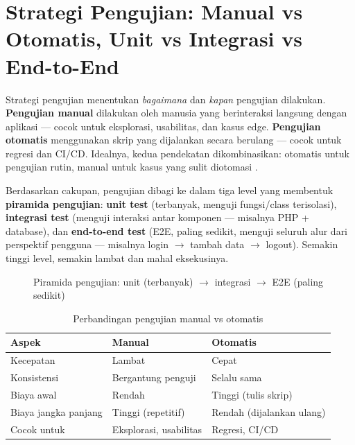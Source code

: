 ﻿\section{Strategi Pengujian: Manual vs Otomatis, Unit vs Integrasi vs End-to-End}

Strategi pengujian menentukan \textit{bagaimana} dan \textit{kapan} pengujian dilakukan. \textbf{Pengujian manual} dilakukan oleh manusia yang berinteraksi langsung dengan aplikasi --- cocok untuk eksplorasi, usabilitas, dan kasus edge. \textbf{Pengujian otomatis} menggunakan skrip yang dijalankan secara berulang --- cocok untuk regresi dan CI/CD. Idealnya, kedua pendekatan dikombinasikan: otomatis untuk pengujian rutin, manual untuk kasus yang sulit diotomasi \cite{mdnToolsTesting}.

Berdasarkan cakupan, pengujian dibagi ke dalam tiga level yang membentuk \textbf{piramida pengujian}: \textbf{unit test} (terbanyak, menguji fungsi/class terisolasi), \textbf{integrasi test} (menguji interaksi antar komponen --- misalnya PHP + database), dan \textbf{end-to-end test} (E2E, paling sedikit, menguji seluruh alur dari perspektif pengguna --- misalnya login $\to$ tambah data $\to$ logout). Semakin tinggi level, semakin lambat dan mahal eksekusinya.

\begin{figure}[H]
\centering
{}
\caption{Piramida pengujian: unit (terbanyak) $\to$ integrasi $\to$ E2E (paling sedikit)}
\end{figure}

\begin{table}[H]
\centering
\begin{tabular}{|P{2.5cm}|P{5cm}|P{5cm}|}
\hline
\textbf{Aspek} & \textbf{Manual} & \textbf{Otomatis} \\
\hline
Kecepatan & Lambat & Cepat \\
\hline
Konsistensi & Bergantung penguji & Selalu sama \\
\hline
Biaya awal & Rendah & Tinggi (tulis skrip) \\
\hline
Biaya jangka panjang & Tinggi (repetitif) & Rendah (dijalankan ulang) \\
\hline
Cocok untuk & Eksplorasi, usabilitas & Regresi, CI/CD \\
\hline
\end{tabular}
\caption{Perbandingan pengujian manual vs otomatis}
\end{table}

